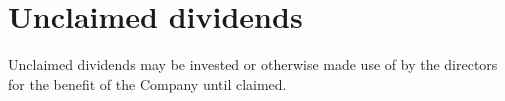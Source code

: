 \section{Unclaimed dividends}

Unclaimed dividends may be invested or otherwise made use of by the directors for the benefit of the Company until claimed. 